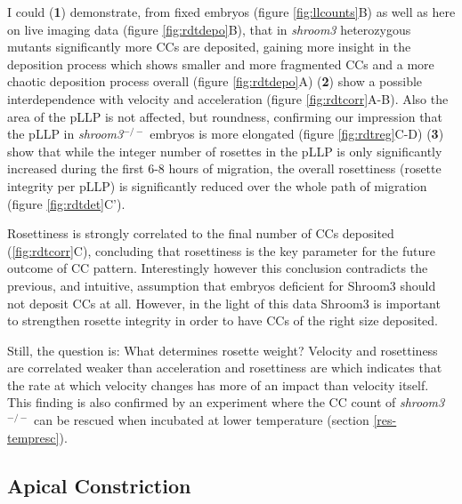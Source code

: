\documentclass[10pt, b5paper, singlespacinge, twoside]{reedthesis} %
\theoremstyle{definition}
\theoremstyle{definition}
\theoremstyle{definition}
\theoremstyle{remark}
\begin{document}
I could (\textbf{1}) demonstrate, from fixed embryos (figure \ref{fig:llcounts}B) as well as here on live imaging data (figure \ref{fig:rdtdepo}B), that in \emph{shroom3} heterozygous mutants significantly more CCs are deposited, gaining more insight in the deposition process which shows smaller and more fragmented CCs and a more chaotic deposition process overall (figure \ref{fig:rdtdepo}A) (\textbf{2}) show a possible interdependence with velocity and acceleration (figure \ref{fig:rdtcorr}A-B). Also the area of the pLLP is not affected, but roundness, confirming our impression that the pLLP in \emph{shroom3}\(^{-/-}\) embryos is more elongated (figure \ref{fig:rdtreg}C-D) (\textbf{3}) show that while the integer number of rosettes in the pLLP is only significantly increased during the first 6-8 hours of migration, the overall rosettiness (rosette integrity per pLLP) is significantly reduced over the whole path of migration (figure \ref{fig:rdtdet}C').

Rosettiness is strongly correlated to the final number of CCs deposited (\ref{fig:rdtcorr}C), concluding that rosettiness is the key parameter for the future outcome of CC pattern. Interestingly however this conclusion contradicts the previous, and intuitive, assumption that embryos deficient for Shroom3 should not deposit CCs at all. However, in the light of this data Shroom3 is important to strengthen rosette integrity in order to have CCs of the right size deposited.

Still, the question is: What determines rosette weight? Velocity and rosettiness are correlated weaker than acceleration and rosettiness are which indicates that the rate at which velocity changes has more of an impact than velocity itself. This finding is also confirmed by an experiment where the CC count of \emph{shroom3}\(^{-/-}\) can be rescued when incubated at lower temperature (section \ref{res-tempresc}).

\hypertarget{apical-constriction-2}{%
\subsection{Apical Constriction}\label{apical-constriction-2}}
\end{document}
